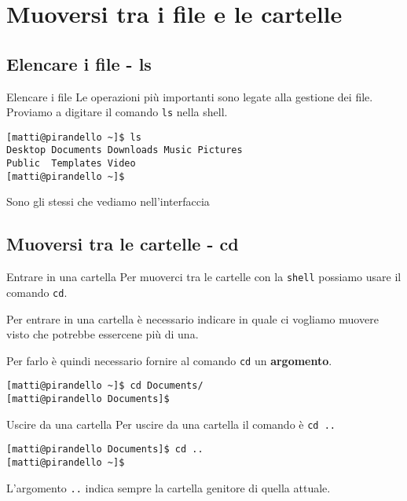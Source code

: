 \section{Muoversi tra i file e le cartelle}

\subsection{Elencare i file - ls}
\begin{frame}[fragile]{Elencare i file}
  Le operazioni più importanti sono legate alla gestione dei file. Proviamo a 
  digitare il comando \texttt{ls} nella shell.\bigskip

    \begin{lstlisting}
[matti@pirandello ~]$ ls
Desktop Documents Downloads Music Pictures 
Public  Templates Video
[matti@pirandello ~]$
    \end{lstlisting}

  Sono gli stessi che vediamo nell'interfaccia
\end{frame}

\subsection{Muoversi tra le cartelle - cd}
\begin{frame}[fragile]{Entrare in una cartella}
  Per muoverci tra le cartelle con la \texttt{shell}
  possiamo usare il comando \texttt{cd}.\bigskip

  Per entrare in una cartella è necessario indicare in quale ci vogliamo muovere 
  visto che potrebbe essercene più di una.\bigskip

  Per farlo è quindi necessario fornire al comando \texttt{cd} un 
  \textbf{argomento}.\bigskip

    \begin{lstlisting}
[matti@pirandello ~]$ cd Documents/
[matti@pirandello Documents]$
    \end{lstlisting}
\end{frame}

\begin{frame}[fragile]{Uscire da una cartella}
  Per uscire da una cartella il comando è \texttt{cd ..}\bigskip
    \begin{lstlisting}
[matti@pirandello Documents]$ cd ..
[matti@pirandello ~]$
    \end{lstlisting}

  L'argomento \texttt{..} indica sempre la cartella genitore di quella attuale.
\end{frame}

